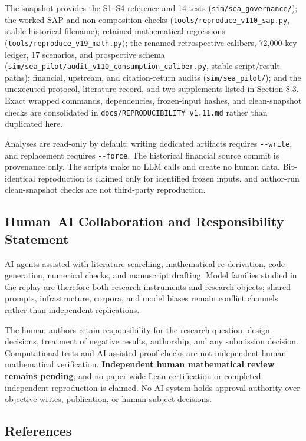 \documentclass[
  11pt]{article}
\begin{document}
The snapshot provides the S1--S4 reference and 14 tests
(\texttt{sim/sea\_governance/}); the worked SAP and non-composition
checks (\texttt{tools/reproduce\_v110\_sap.py}, stable historical
filename); retained mathematical regressions
(\texttt{tools/reproduce\_v19\_math.py}); the renamed retrospective
calibers, 72,000-key ledger, 17 scenarios, and prospective schema
(\texttt{sim/sea\_pilot/audit\_v110\_consumption\_caliber.py}, stable
script/result paths); financial, upstream, and citation-return audits
(\texttt{sim/sea\_pilot/}); and the unexecuted protocol, literature
record, and two supplements listed in Section 8.3. Exact wrapped
commands, dependencies, frozen-input hashes, and clean-snapshot checks
are consolidated in \texttt{docs/REPRODUCIBILITY\_v1.11.md} rather than
duplicated here.

Analyses are read-only by default; writing dedicated artifacts requires
\texttt{-\/-write}, and replacement requires \texttt{-\/-force}. The
historical financial source commit is provenance only. The scripts make
no LLM calls and create no human data. Bit-identical reproduction is
claimed only for identified frozen inputs, and author-run clean-snapshot
checks are not third-party reproduction.

\subsection{Human--AI Collaboration and Responsibility
Statement}\label{humanai-collaboration-and-responsibility-statement}

AI agents assisted with literature searching, mathematical
re-derivation, code generation, numerical checks, and manuscript
drafting. Model families studied in the replay are therefore both
research instruments and research objects; shared prompts,
infrastructure, corpora, and model biases remain conflict channels
rather than independent replications.

The human authors retain responsibility for the research question,
design decisions, treatment of negative results, authorship, and any
submission decision. Computational tests and AI-assisted proof checks
are not independent human mathematical verification. \textbf{Independent
human mathematical review remains pending}, and no paper-wide Lean
certification or completed independent reproduction is claimed. No AI
system holds approval authority over objective writes, publication, or
human-subject decisions.

\subsection{References}\label{references}
\end{document}

